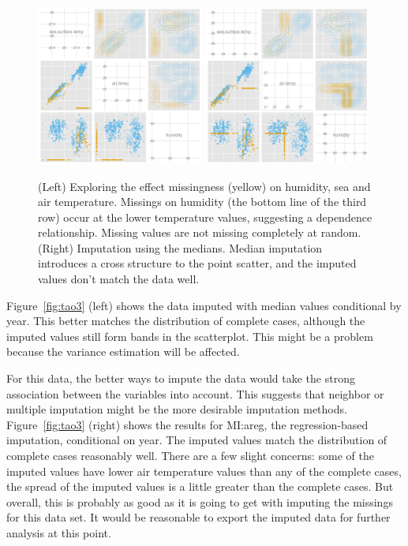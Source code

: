 \documentclass[article]{jss}
\begin{document}
\begin{figure}[htp]
\centerline{\includegraphics[width=0.49\textwidth]{graph/fig4-3-below10-uncondition}
\includegraphics[width=0.49\textwidth]{graph/fig4-1-median-uncondition}}
\caption{(Left) Exploring the effect missingness (yellow) on
humidity, sea and air temperature. Missings on humidity (the
bottom line of the third row) occur at the lower temperature
values, suggesting a dependence relationship. Missing values
are not missing completely at random. (Right) Imputation using
the medians. Median imputation introduces a cross structure to
the point scatter, and the imputed values don't match the data well.}
\label{fig:tao1}
\end{figure}


Figure~\ref{fig:tao3} (left) shows the data imputed with
median values conditional by year. This better matches the
distribution of complete cases, although the imputed values
still form bands in the scatterplot. This might be a problem
because the variance estimation will be affected. 

For this data, the better ways to impute the data would take
the strong association between the variables into account.
This suggests that neighbor or multiple imputation might be
the more desirable imputation methods. Figure~\ref{fig:tao3}
(right) shows the results for MI:areg, the regression-based
imputation, conditional on year. The imputed values match
the distribution of complete cases reasonably well. There
are a few slight concerns: some of the imputed values have
lower air temperature values than any of the complete cases,
the spread of the imputed values is a little greater than
the complete cases. But overall, this is probably as good
as it is going to get with imputing the missings for this
data set. It would be reasonable to export the imputed data
for further analysis at this point.
\end{document}
